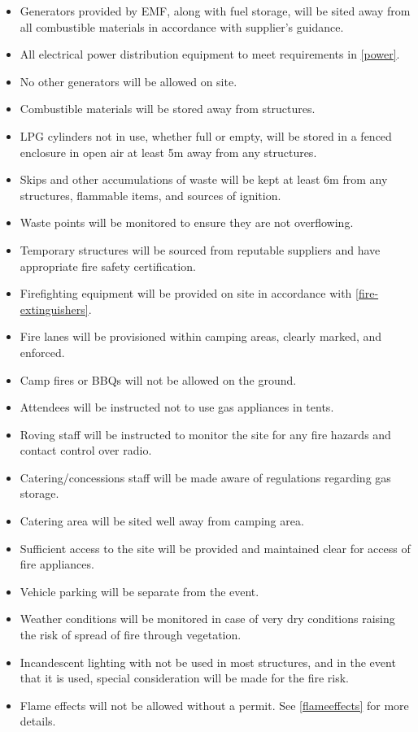 \begin{itemize}
    \tightlist
    \item Generators provided by EMF, along with fuel storage, will be sited away from all
          combustible materials in accordance with supplier's guidance.
    \item All electrical power distribution equipment to meet requirements in \cref{power}.
    \item No other generators will be allowed on site.
    \item Combustible materials will be stored away from structures.
    \item LPG cylinders not in use, whether full or empty, will be stored in a fenced enclosure in open air at least 5m
          away from any structures.
    \item Skips and other accumulations of waste will be kept at least 6m from any structures, flammable items, and sources of ignition.
    \item Waste points will be monitored to ensure they are not overflowing.
    \item Temporary structures will be sourced from reputable suppliers and have appropriate fire safety certification.
    \item Firefighting equipment will be provided on site in accordance with \cref{fire-extinguishers}.
    \item Fire lanes will be provisioned within camping areas, clearly marked, and enforced.
    \item Camp fires or BBQs will not be allowed on the ground.
    \item Attendees will be instructed not to use gas appliances in tents.
    \item Roving staff will be instructed to monitor the site for any fire hazards and contact control over radio.
    \item Catering/concessions staff will be made aware of regulations regarding gas storage.
    \item Catering area will be sited well away from camping area.
    \item Sufficient access to the site will be provided and maintained clear for access of fire appliances.
    \item Vehicle parking will be separate from the event.
    \item Weather conditions will be monitored in case of very dry conditions raising the risk of spread of fire through vegetation.
    \item Incandescent lighting with not be used in most structures, and in the event that it is used, special consideration will be made for the fire risk.
    \item Flame effects will not be allowed without a permit. See \cref{flameeffects} for more details.
\end{itemize}

